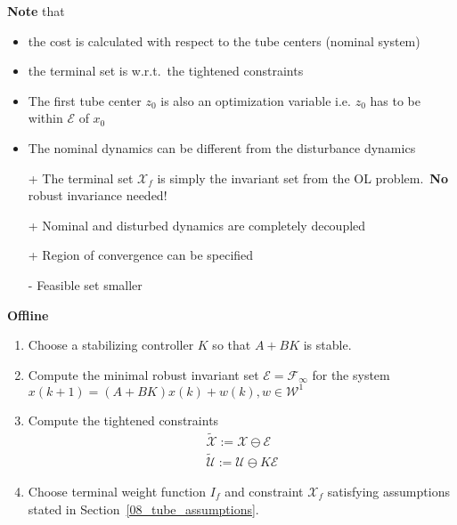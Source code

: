 \textbf{Note} that
\begin{itemize}
    \item the cost is calculated with respect to the tube centers (nominal system)
    \item the terminal set is w.r.t.\ the tightened constraints
    \item The first tube center $z_0$ is also an optimization variable i.e. $z_0$ has to be within $\mathcal{E}$ of $x_0$
    \item The nominal dynamics can be different from the disturbance dynamics
\end{itemize}

\newpar{}

\begin{itemize}
    \item [+] The terminal set $\mathcal{X}_f$ is simply the invariant set from the OL problem.~\textbf{No} robust invariance needed!
    \item [+] Nominal and disturbed dynamics are completely decoupled
    \item [+] Region of convergence can be specified        %
    \item [-] Feasible set smaller  %
\end{itemize}

\newpar{}

\textbf{Offline}
\begin{enumerate}
    \item Choose a stabilizing controller $K$ so that $A + BK$ is stable.
    \item Compute the minimal robust invariant set $\mathcal{E} = \mathcal{F}_\infty$ for the system $x(k+1) = (A + BK )x(k) + w(k), w \in \mathcal{W}^1$
    \item Compute the tightened constraints \begin{gather*}
              \widetilde{\mathcal{X}}:=\mathcal{X} \ominus \mathcal{E} \\
              \widetilde{\mathcal{U}}:=\mathcal{U} \ominus K\mathcal{E}
          \end{gather*}
    \item Choose terminal weight function $I_f$ and constraint $\mathcal{X}_f$ satisfying assumptions stated in Section~\ref{08_tube_assumptions}.
\end{enumerate}

